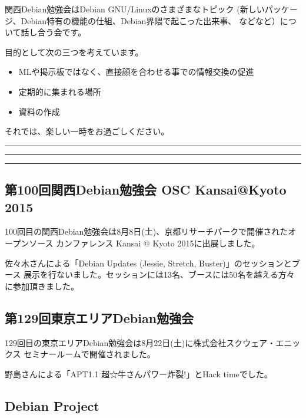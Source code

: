 \documentclass[mingoth,a4paper]{jsarticle}
\begin{document}
 関西Debian勉強会はDebian GNU/Linuxのさまざまなトピック
 (新しいパッケージ、Debian特有の機能の仕組、Debian界隈で起こった出来事、
 などなど）について話し合う会です。

 目的として次の三つを考えています。
 \begin{itemize}
  \item MLや掲示板ではなく、直接顔を合わせる事での情報交換の促進
  \item 定期的に集まれる場所
  \item 資料の作成
 \end{itemize}

 それでは、楽しい一時をお過ごしください。

\newpage

\begin{minipage}[b]{0.2\hsize}
 {}
\end{minipage}
\begin{minipage}[b]{0.8\hsize}
\hrule
\vspace{2mm}
\hrule
\setcounter{tocdepth}{1}
\tableofcontents
\vspace{2mm}
\hrule
\end{minipage}


\subsection{第100回関西Debian勉強会 OSC Kansai@Kyoto 2015}

100回目の関西Debian勉強会は8月8日(土)、京都リサーチパークで開催されたオープンソース
カンファレンス Kansai @ Kyoto 2015に出展しました。

佐々木さんによる「Debian Updates (Jessie, Stretch, Buster)」のセッションとブース
展示を行ないました。セッションには13名、ブースには50名を越える方々に参加頂きました。

\subsection{第129回東京エリアDebian勉強会}

129回目の東京エリアDebian勉強会は8月22日(土)に株式会社スクウェア・エニッ
クス セミナールームで開催されました。

野島さんによる「APT1.1 超☆牛さんパワー炸裂!」とHack timeでした。


\subsection{Debian Project}
\end{document}
